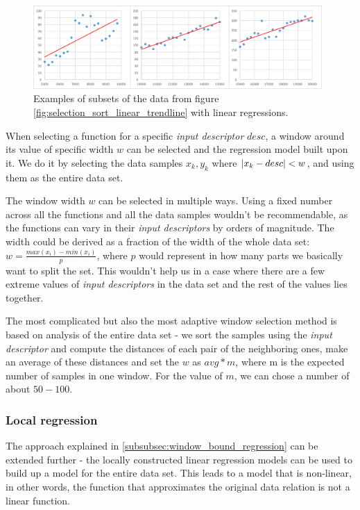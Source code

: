 \begin{figure}[h!]
	\centerline{\mbox{\includegraphics[width=110mm]{./img/window_examples.png}}}
	\caption{Examples of subsets of the data from figure \ref{fig:selection_sort_linear_trendline} with linear regressions.}
	\label{fig:window_examples}
\end{figure}

When selecting a function for a specific \textit{input descriptor} $desc$, a window around its value of specific width $w$ can be selected and the regression model built upon it. We do it by selecting the data samples $x_k, y_k$ where $\left|{x_k - desc}\right| < w$, and using them as the entire data set.

The window width $w$ can be selected in multiple ways. Using a fixed number across all the functions and all the data samples wouldn't be recommendable, as the functions can vary in their \textit{input descriptors} by orders of magnitude. The width could be derived as a fraction of the width of the whole data set: $w = \frac{max(x_i) - min(x_i)}{p}$, where $p$ would represent in how many parts we basically want to split the set. This wouldn't help us in a case where there are a few extreme values of \textit{input descriptors} in the data set and the rest of the values lies together. 

The most complicated but also the most adaptive window selection method is based on analysis of the entire data set - we sort the samples using the \textit{input descriptor} and compute the distances of each pair of the neighboring ones, make an average of these distances and set the $w$ as $avg * m$, where m is the expected number of samples in one window. For the value of $m$, we can chose a number of about $50-100$.

\subsubsection{Local regression}

The approach explained in \ref{subsubsec:window_bound_regression} can be extended further - the locally constructed linear regression models can be used to build up a model for the entire data set. This leads to a model that is non-linear, in other words, the function that approximates the original data relation is not a linear function.

